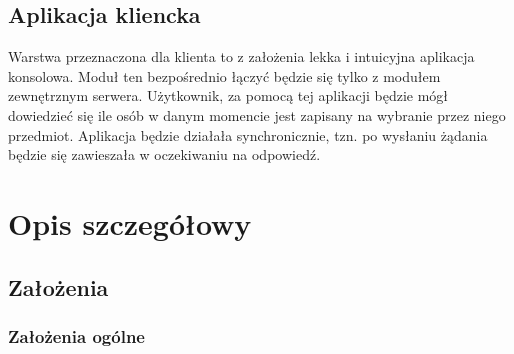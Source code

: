 \subsection*[Aplikacja kliencka]{Aplikacja kliencka}

\par{Warstwa przeznaczona dla klienta to z założenia lekka i intuicyjna aplikacja konsolowa. Moduł ten bezpośrednio łączyć będzie się tylko z modułem zewnętrznym serwera. Użytkownik, za pomocą tej aplikacji będzie mógł dowiedzieć się ile osób w danym momencie jest zapisany na wybranie przez niego przedmiot. Aplikacja będzie działała synchronicznie, tzn. po wysłaniu żądania będzie się zawieszała w oczekiwaniu na odpowiedź.}

\section[Opis szczegółowy]{Opis szczegółowy}

\subsection[Założenia]{Założenia}



\subsubsection*[Założenia ogólne]{Założenia ogólne} \label{z:o}

